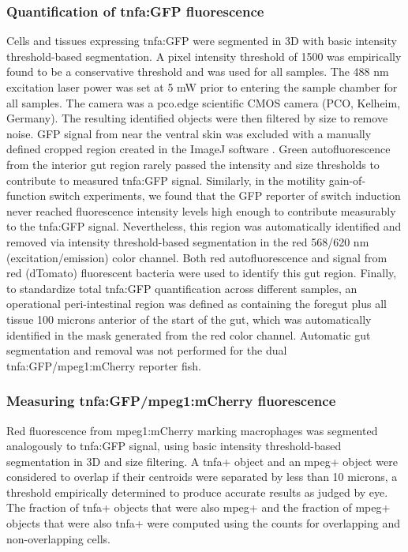 \subsubsection{Quantification of tnfa:GFP fluorescence}
Cells and tissues expressing tnfa:GFP were segmented in 3D with basic intensity threshold-based segmentation. A pixel intensity threshold of 1500 was empirically found to be a conservative threshold and was used for all samples. The 488 nm excitation laser power was set at 5 mW prior to entering the sample chamber for all samples. The camera was a pco.edge scientific CMOS camera (PCO, Kelheim, Germany). The resulting identified objects were then filtered by size to remove noise. GFP signal from near the ventral skin was excluded with a manually defined cropped region created in the ImageJ software \cite{schindelin_fiji_2012}. Green autofluorescence from the interior gut region rarely passed the intensity and size thresholds to contribute to measured tnfa:GFP signal. Similarly, in the motility gain-of-function switch experiments, we found that the GFP reporter of switch induction never reached fluorescence intensity levels high enough to contribute measurably to the tnfa:GFP signal. Nevertheless, this region was automatically identified and removed via intensity threshold-based segmentation in the red 568/620 nm (excitation/emission) color channel. Both red autofluorescence and signal from red (dTomato) fluorescent bacteria were used to identify this gut region. Finally, to standardize total tnfa:GFP quantification across different samples, an operational peri-intestinal region was defined as containing the foregut plus all tissue 100 microns anterior of the start of the gut, which was automatically identified in the mask generated from the red color channel. Automatic gut segmentation and removal was not performed for the dual tnfa:GFP/mpeg1:mCherry reporter fish.

\subsubsection{Measuring tnfa:GFP/mpeg1:mCherry fluorescence}
Red fluorescence from mpeg1:mCherry marking macrophages was segmented analogously to tnfa:GFP signal, using basic intensity threshold-based segmentation in 3D and size filtering. A tnfa+ object and an mpeg+ object were considered to overlap if their centroids were separated by less than 10 microns, a threshold empirically determined to produce accurate results as judged by eye. The fraction of tnfa+ objects that were also mpeg+ and the fraction of mpeg+ objects that were also tnfa+ were computed using the counts for overlapping and non-overlapping cells.

